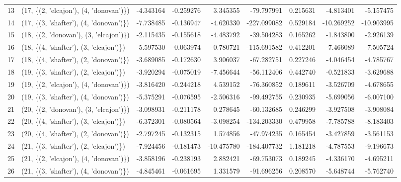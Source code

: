 \begin{tabular}{llrrrrrrr}
13 &  (17, \{(2, 'elcajon'), (4, 'donovan')\}) &  -4.343164 & -0.259276 &   3.345355 &  -79.797991 &  0.215631 &  -4.813401 &  -5.157475 \\
14 &  (17, \{(3, 'shafter'), (4, 'donovan')\}) &  -7.738485 & -0.136947 &  -4.620330 & -227.099082 &  0.529184 & -10.269252 & -10.903995 \\
15 &  (18, \{(2, 'donovan'), (3, 'elcajon')\}) &  -2.115435 & -0.155618 &  -4.483792 &  -39.504283 &  0.165262 &  -1.843800 &  -2.926139 \\
16 &  (18, \{(4, 'shafter'), (3, 'elcajon')\}) &  -5.597530 & -0.063974 &  -0.780721 & -115.691582 &  0.412201 &  -7.466089 &  -7.505724 \\
17 &  (18, \{(4, 'shafter'), (2, 'donovan')\}) &  -3.689085 & -0.172630 &   3.906037 &  -67.282751 &  0.227246 &  -4.046454 &  -4.785767 \\
18 &  (19, \{(3, 'shafter'), (2, 'elcajon')\}) &  -3.920294 & -0.075019 &  -7.456644 &  -56.112406 &  0.442740 &  -0.521833 &  -3.629688 \\
19 &  (19, \{(2, 'elcajon'), (4, 'donovan')\}) &  -3.816420 & -0.244218 &   4.539152 &  -76.360852 &  0.189611 &  -3.526709 &  -4.678655 \\
20 &  (19, \{(3, 'shafter'), (4, 'donovan')\}) &  -5.375291 & -0.076595 &  -2.506316 &  -99.492755 &  0.230935 &  -5.699056 &  -6.007100 \\
21 &  (20, \{(2, 'donovan'), (3, 'elcajon')\}) &  -3.098931 & -0.211178 &   0.278645 &  -60.132685 &  0.246299 &  -3.927508 &  -3.908084 \\
22 &  (20, \{(4, 'shafter'), (3, 'elcajon')\}) &  -6.372301 & -0.080564 &  -3.098254 & -134.203330 &  0.479958 &  -7.785788 &  -8.183403 \\
23 &  (20, \{(4, 'shafter'), (2, 'donovan')\}) &  -2.797245 & -0.132315 &   1.574856 &  -47.974235 &  0.165454 &  -3.427859 &  -3.561153 \\
24 &  (21, \{(3, 'shafter'), (2, 'elcajon')\}) &  -7.924456 & -0.181473 & -10.475780 & -184.407732 &  1.181218 &  -4.787553 &  -9.196673 \\
25 &  (21, \{(2, 'elcajon'), (4, 'donovan')\}) &  -3.858196 & -0.238193 &   2.882421 &  -69.753073 &  0.189245 &  -4.336170 &  -4.695211 \\
26 &  (21, \{(3, 'shafter'), (4, 'donovan')\}) &  -4.845461 & -0.061695 &   1.331579 &  -91.696256 &  0.208570 &  -5.648744 &  -5.762740 \\
\bottomrule
\end{tabular}
